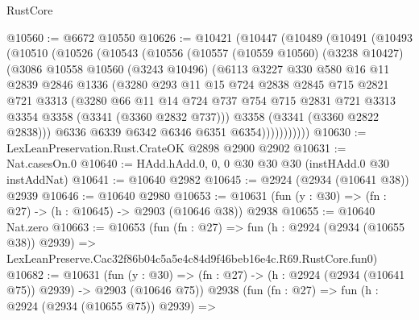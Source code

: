\begin{lexlean}{RustCore}
\begin{coremodule}
@10560 := @6672 @10550
@10626 := @10421
    (@10447
      (@10489
        (@10491
          (@10493
            (@10510
              (@10526
                (@10543
                  (@10556
                    (@10557
                      (@10559 @10560)
                      (@3238 @10427)
                      (@3086
                        @10558
                        @10560
                        (@3243 @10496)
                        (@6113
                          @3227
                          @330
                          @580
                          @16
                          @11
                          @2839
                          @2846
                          @1336
                          (@3280
                            @293
                            @11
                            @15
                            @724
                            @2838
                            @2845
                            @715
                            @2821
                            @721
                            @3313
                            (@3280
                              @66
                              @11
                              @14
                              @724
                              @737
                              @754
                              @715
                              @2831
                              @721
                              @3313
                              @3354
                              @3358
                              (@3341 (@3360 @2832 @737)))
                            @3358
                            (@3341 (@3360 @2822 @2838)))
                          @6336
                          @6339
                          @6342
                          @6346
                          @6351
                          @6354)))))))))))
@10630 := LexLeanPreservation.Rust.CrateOK @2898 @2900 @2902
@10631 := Nat.casesOn.{0}
@10640 := HAdd.hAdd.{0, 0, 0} @30 @30 @30 (instHAdd.{0} @30 instAddNat)
@10641 := @10640 @2982
@10645 := @2924 (@2934 (@10641 @38)) @2939
@10646 := @10640 @2980
@10653 := @10631 (fun (y : @30) => (fn : @27) -> (h : @10645) -> @2903 (@10646 @38)) @2938
@10655 := @10640 Nat.zero
@10663 := @10653
    (fun (fn : @27) =>
    fun (h : @2924 (@2934 (@10655 @38)) @2939) =>
    LexLeanPreserve.Cac32f86b04c5a5e4c84d9f46beb16e4c.R69.RustCore.fun0)
@10682 := @10631
    (fun (y : @30) => (fn : @27) -> (h : @2924 (@2934 (@10641 @75)) @2939) -> @2903 (@10646 @75))
    @2938
    (fun (fn : @27) =>
    fun (h : @2924 (@2934 (@10655 @75)) @2939) =>

\end{coremodule}
\end{lexlean}
